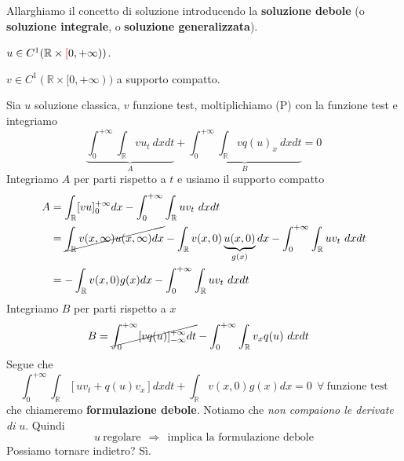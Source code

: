 \documentclass[10pt,a4paper,twoside,openright]{book}
\begin{document}
Allarghiamo il concetto di soluzione introducendo la \textbf{soluzione debole} (o \textbf{soluzione integrale}, o \textbf{soluzione generalizzata}).
\begin{definition}
 $u\in C^{1}(\mathbb{R} \times \textcolor[rgb]{0.82,0.01,0.11}{[} 0,+\infty ))$.
\end{definition}
\begin{definition}
 $v\in C^{1}(\mathbb{R} \times [ 0,+\infty ))$ a supporto compatto.
\end{definition}
Sia $u$ soluzione classica, $v$ funzione test, moltiplichiamo (P) con la funzione test e integriamo
\begin{equation*}
	\underbrace{\int ^{+\infty }_{0}\int _{\mathbb{R}} vu_{t} \ dxdt}_{A} +\underbrace{\int ^{+\infty }_{0}\int _{\mathbb{R}} vq( u)_{x} \ dxdt}_{B} =0
\end{equation*}
Integriamo $A$ per parti rispetto a $t$ e usiamo il supporto compatto
\begin{align*}
	A & =\int _{\mathbb{R}}[ vu]^{+\infty }_{0} dx-\int ^{+\infty }_{0}\int _{\mathbb{R}} uv_{t} \ dxdt                  \\
	  & = \cancel{\int _{\mathbb{R}} v( x,\infty ) u(x,\infty ) dx} -\int _{\mathbb{R}} v( x,0)\underbrace{u( x,0)}_{g( x)} dx-\int ^{+\infty }_{0}\int _{\mathbb{R}} uv_{t} \ dxdt \\
	  & =-\int _{\mathbb{R}} v( x,0) g( x) dx-\int ^{+\infty }_{0}\int _{\mathbb{R}} uv_{t} \ dxdt                       
\end{align*}
Integriamo $B$ per parti rispetto a $x$
\begin{align*}
	B & =\cancel{\int ^{+\infty }_{0}[ vq( u)]^{+\infty }_{-\infty } dt} -\int ^{+\infty }_{0}\int _{\mathbb{R}} v_{x} q( u) \ dxdt 
\end{align*}
Segue che
\begin{equation}
	\int ^{+\infty }_{0}\int _{\mathbb{R}}[ uv_{t} +q( u) v_{x}] dxdt+\int _{\mathbb{R}} v( x,0) g( x) dx=0\ \ \forall \ \text{funzione test}
\label{eq:formulazione-debole}
\end{equation}
che chiameremo \textbf{formulazione debole}. Notiamo che \textit{non compaiono le derivate di} $u$. Quindi
\begin{equation*}
	u\ \text{regolare} \ \ \Rightarrow \ \ \text{implica la formulazione debole}
\end{equation*}
Possiamo tornare indietro? Sì.
				
\end{document}
